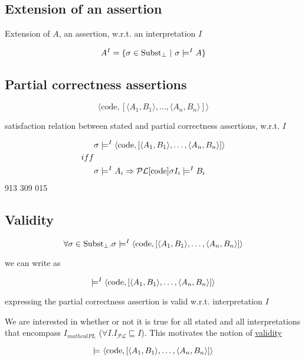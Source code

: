 
\subsection{Extension of an assertion}

Extension of $A$, an assertion, w.r.t. an interpretation $I$

$$ A^{I} = \{ \sigma \in \text{Subst}_{\bot}\ |\  \sigma \models^{I} A \} $$

\subsection{Partial correctness assertions}

$$ \langle \text{code}, [\langle A_{1}, B_{1} \rangle,\ldots, \langle
  A_{n}, B_{n} \rangle] \rangle $$

satisfaction relation between stated and partial correctness assertions,
w.r.t. $I$

\begin{align*}
& \sigma \models^{I} \langle \text{code}, [\langle A_{1}, B_{1}
      \rangle,\ldots, \langle A_{n}, B_{n} \rangle] \rangle
\\iff&\\
& \sigma \models^{I} A_{i} \Rightarrow
   \mathcal{PL} [ \text{code} ] \sigma I_{i} \models^{I} B_{i}
\end{align*}
913 309 015
\subsection{Validity}
$$\forall \sigma \in \text{Subst}_{\bot}.  \sigma \models^{I} \langle \text{code}, [\langle A_{1}, B_{1}
      \rangle,\ldots, \langle A_{n}, B_{n} \rangle] \rangle$$

we can write as 

$$   \models^{I} \langle \text{code}, [\langle A_{1}, B_{1}
      \rangle,\ldots, \langle A_{n}, B_{n} \rangle] \rangle$$

expressing the partial correctness assertion is valid
w.r.t. interpretation $I$

We are interested in whether or not it is true for all stated and all
interpretations that encompass $I_{mathcal{PL}}$ ($\forall
I. I_{\mathcal{PL}} \sqsubseteq I$).
%
This motivates the notion of \underline{validity}

$$   \models^{} \langle \text{code}, [\langle A_{1}, B_{1}
      \rangle,\ldots, \langle A_{n}, B_{n} \rangle] \rangle$$

